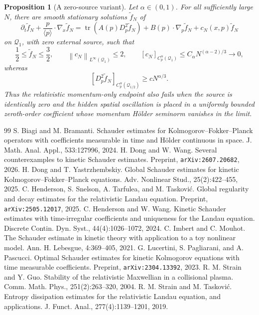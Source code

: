 \documentclass[10pt,a4paper]{amsart}
\numberwithin{equation}{section}
\newtheorem{proposition}[theorem]{Proposition}
\DeclareMathOperator{\tr}{tr}
\newcommand{\norm}[1]{\left\|#1\right\|}
\newcommand{\la}[1]{\langle #1\rangle}
\begin{document}
\begin{proposition}[A zero-source variant]\label{prop:rel-zero-source}
Let $\alpha\in(0,1)$.  For all sufficiently large $N$, there are smooth stationary solutions
$\widetilde f_N$ of
\begin{equation}\label{eq:rel-zero-source}
   \partial_t\widetilde f_N+\frac p{\la p}\cdot\nabla_x\widetilde f_N
   =\tr\!\left(A(p)D_p^2\widetilde f_N\right)
    +B(p)\cdot\nabla_p\widetilde f_N+c_N(x,p)\widetilde f_N
\end{equation}
on $\mathcal Q_1$, with zero external source, such that
\[
   \frac12\le \widetilde f_N\le\frac32,
   \qquad
   \norm{c_N}_{L^\infty(\mathcal Q_1)}\le2,
   \qquad
   [c_N]_{C_p^\alpha(\mathcal Q_1)}
      \le C_\alpha N^{(\alpha-2)/3}\longrightarrow0,
\]
whereas
\[
   [D_p^2\widetilde f_N]_{C_p^\alpha(\mathcal Q_{1/2})}
   \ge cN^{\alpha/3}.
\]
Thus the relativistic momentum-only endpoint also fails when the source is identically zero and the hidden spatial oscillation is placed in a uniformly bounded zeroth-order coefficient whose momentum H\"older seminorm vanishes in the limit.
\end{proposition}

\begin{thebibliography}{99}
 S. Biagi and M. Bramanti. \newblock Schauder estimates for Kolmogorov--Fokker--Planck operators with coefficients measurable in time and H\"older continuous in space. \newblock J. Math. Anal. Appl., 533:127996, 2024.
 H. Dong and W. Wang. \newblock Several counterexamples to kinetic Schauder estimates. \newblock Preprint, \texttt{arXiv:2607.20682}, 2026.
 H. Dong and T. Yastrzhembskiy. \newblock Global Schauder estimates for kinetic Kolmogorov--Fokker--Planck equations. \newblock Adv. Nonlinear Stud., 25(2):422--455, 2025.
 C. Henderson, S. Snelson, A. Tarfulea, and M. Taskovi\'c. \newblock Global regularity and decay estimates for the relativistic Landau equation. \newblock Preprint, \texttt{arXiv:2505.12017}, 2025.
 C. Henderson and W. Wang. \newblock Kinetic Schauder estimates with time-irregular coefficients and uniqueness for the Landau equation. \newblock Discrete Contin. Dyn. Syst., 44(4):1026--1072, 2024.
 C. Imbert and C. Mouhot. \newblock The Schauder estimate in kinetic theory with application to a toy nonlinear model. \newblock Ann. H. Lebesgue, 4:369--405, 2021.
 G. Lucertini, S. Pagliarani, and A. Pascucci. \newblock Optimal Schauder estimates for kinetic Kolmogorov equations with time measurable coefficients. \newblock Preprint, \texttt{arXiv:2304.13392}, 2023.
 R. M. Strain and Y. Guo. \newblock Stability of the relativistic Maxwellian in a collisional plasma. \newblock Comm. Math. Phys., 251(2):263--320, 2004.
 R. M. Strain and M. Taskovi\'c. \newblock Entropy dissipation estimates for the relativistic Landau equation, and applications. \newblock J. Funct. Anal., 277(4):1139--1201, 2019.
\end{thebibliography}
\end{document}
